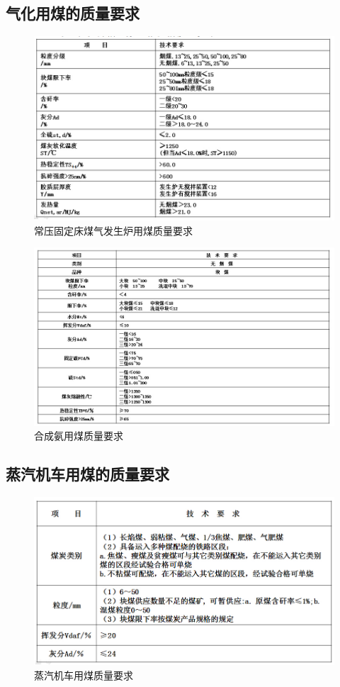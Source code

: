 \documentclass[10pt,openany]{ctexbook}
\begin{document}
\subsection{气化用煤的质量要求}
 \begin{figure}[!ht]
\includegraphics[scale=0.67]{14}
\caption{常压固定床煤气发生炉用煤质量要求  }
\end{figure}

 \begin{figure}[!ht]
\includegraphics[scale=0.6]{15}
\caption{合成氨用煤质量要求 }
\end{figure}

\subsection{蒸汽机车用煤的质量要求}
 \begin{figure}[!ht]
\includegraphics[scale=0.64]{16}
\caption{蒸汽机车用煤质量要求 }
\end{figure}
\end{document}
